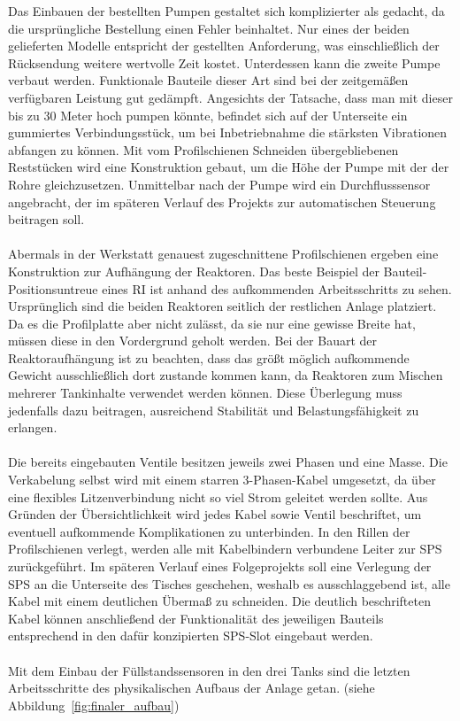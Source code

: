 	Das Einbauen der bestellten Pumpen gestaltet sich komplizierter als gedacht, da die ursprüngliche Bestellung einen Fehler beinhaltet. Nur eines der beiden gelieferten Modelle entspricht der gestellten Anforderung, was einschließlich der Rücksendung weitere wertvolle Zeit kostet. Unterdessen kann die zweite Pumpe verbaut werden. Funktionale Bauteile dieser Art sind bei der zeitgemäßen verfügbaren Leistung gut gedämpft. Angesichts der Tatsache, dass man mit dieser bis zu 30 Meter hoch pumpen könnte, befindet sich auf der Unterseite ein gummiertes Verbindungsstück, um bei Inbetriebnahme die stärksten Vibrationen abfangen zu können. Mit vom Profilschienen Schneiden übergebliebenen Reststücken wird eine Konstruktion gebaut, um die Höhe der Pumpe mit der der Rohre gleichzusetzen. Unmittelbar nach der Pumpe wird ein Durchflusssensor angebracht, der im späteren Verlauf des Projekts zur automatischen Steuerung beitragen soll.\\\\
	Abermals in der Werkstatt genauest zugeschnittene Profilschienen ergeben eine Konstruktion zur Aufhängung der Reaktoren. Das beste Beispiel der Bauteil-Positionsuntreue eines \ac{RI} ist anhand des aufkommenden Arbeitsschritts zu sehen. Ursprünglich sind die beiden Reaktoren seitlich der restlichen Anlage platziert. Da es die Profilplatte aber nicht zulässt, da sie nur eine gewisse Breite hat, müssen diese in den Vordergrund geholt werden. Bei der Bauart der Reaktoraufhängung ist zu beachten, dass das größt möglich aufkommende Gewicht ausschließlich dort zustande kommen kann, da Reaktoren zum Mischen mehrerer Tankinhalte verwendet werden können. Diese Überlegung muss jedenfalls dazu beitragen, ausreichend Stabilität und Belastungsfähigkeit zu erlangen.\\\\	
	Die bereits eingebauten Ventile besitzen jeweils zwei Phasen und eine Masse. Die Verkabelung selbst wird mit einem starren 3-Phasen-Kabel umgesetzt, da über eine flexibles Litzenverbindung nicht so viel Strom geleitet werden sollte. Aus Gründen der Übersichtlichkeit wird jedes Kabel sowie Ventil beschriftet, um eventuell aufkommende Komplikationen zu unterbinden. In den Rillen der Profilschienen verlegt, werden alle mit Kabelbindern verbundene Leiter zur \ac{SPS} zurückgeführt. Im späteren Verlauf eines Folgeprojekts soll eine Verlegung der \ac{SPS} an die Unterseite des Tisches geschehen, weshalb es ausschlaggebend ist, alle Kabel mit einem deutlichen Übermaß zu schneiden. Die deutlich beschrifteten Kabel können anschließend der Funktionalität des jeweiligen Bauteils entsprechend in den dafür konzipierten \ac{SPS}-Slot eingebaut werden.\\\\
	Mit dem Einbau der Füllstandssensoren in den drei Tanks sind die letzten Arbeitsschritte des physikalischen Aufbaus der Anlage getan. (siehe Abbildung~\ref{fig:finaler_aufbau})
	
